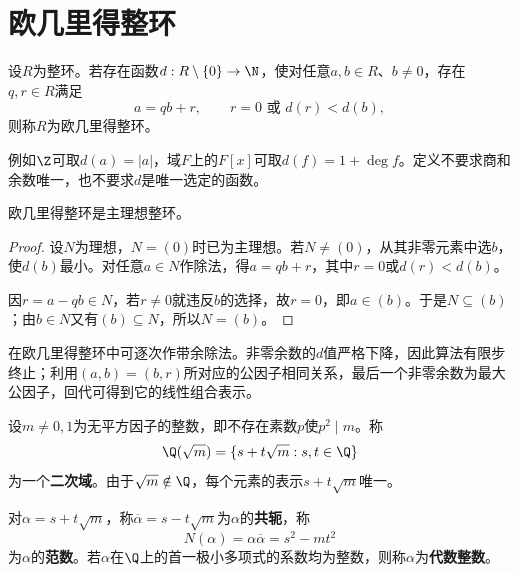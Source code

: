 \section{欧几里得整环}

\begin{definition}
设$R$为整环。若存在函数$d:R\setminus\{0\}\to\N$，使对任意$a,b\in R$、$b\ne0$，存在$q,r\in R$满足
\[
a=qb+r,\qquad r=0\text{ 或 }d(r)<d(b),
\]
则称$R$为欧几里得整环。
\end{definition}

例如$\Z$可取$d(a)=|a|$，域$F$上的$F[x]$可取$d(f)=1+\deg f$。定义不要求商和余数唯一，也不要求$d$是唯一选定的函数。

\begin{theorem}\label{p2:euclidean-pid}
欧几里得整环是主理想整环。
\end{theorem}
\begin{proof}
设$N$为理想，$N=(0)$时已为主理想。若$N\ne(0)$，从其非零元素中选$b$，使$d(b)$最小。对任意$a\in N$作除法，得$a=qb+r$，其中$r=0$或$d(r)<d(b)$。

因$r=a-qb\in N$，若$r\ne0$就违反$b$的选择，故$r=0$，即$a\in(b)$。于是$N\subseteq(b)$；由$b\in N$又有$(b)\subseteq N$，所以$N=(b)$。
\end{proof}

在欧几里得整环中可逐次作带余除法。非零余数的$d$值严格下降，因此算法有限步终止；利用$(a,b)=(b,r)$所对应的公因子相同关系，最后一个非零余数为最大公因子，回代可得到它的线性组合表示。

\begin{definition}
设$m\ne0,1$为无平方因子的整数，即不存在素数$p$使$p^2\mid m$。称
\[
\Q(\sqrt m)=\{s+t\sqrt m:s,t\in\Q\}
\]
为一个\textbf{二次域}。由于$\sqrt m\notin\Q$，每个元素的表示$s+t\sqrt m$唯一。

对$\alpha=s+t\sqrt m$，称$\overline\alpha=s-t\sqrt m$为$\alpha$的\textbf{共轭}，称
\[
N(\alpha)=\alpha\overline\alpha=s^2-mt^2
\]
为$\alpha$的\textbf{范数}。若$\alpha$在$\Q$上的首一极小多项式的系数均为整数，则称$\alpha$为\textbf{代数整数}。
\end{definition}

